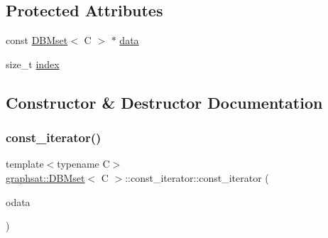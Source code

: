 \subsection*{Protected Attributes}
\begin{DoxyCompactItemize}
\item 
const \mbox{\hyperlink{classgraphsat_1_1_d_b_mset}{D\+B\+Mset}}$<$ C $>$ $\ast$ \mbox{\hyperlink{classgraphsat_1_1_d_b_mset_1_1const__iterator_a60449a8735b6e159ba72f0f76e851cbe}{data}}
\item 
size\+\_\+t \mbox{\hyperlink{classgraphsat_1_1_d_b_mset_1_1const__iterator_a49e5420ca3eb37b0e27bb0be57338051}{index}}
\end{DoxyCompactItemize}


\subsection{Constructor \& Destructor Documentation}
\mbox{\label{classgraphsat_1_1_d_b_mset_1_1const__iterator_acc4063dc1e5ba8bbeddfc5814dc3a417}} 
\subsubsection{\texorpdfstring{const\_iterator()}{const\_iterator()}\hspace{0.1cm}{\footnotesize\ttfamily [1/3]}}
{\footnotesize\ttfamily template$<$typename C$>$ \\
\mbox{\hyperlink{classgraphsat_1_1_d_b_mset}{graphsat\+::\+D\+B\+Mset}}$<$ C $>$\+::const\+\_\+iterator\+::const\+\_\+iterator (\begin{DoxyParamCaption}\item[{const \mbox{\hyperlink{classgraphsat_1_1_d_b_mset}{D\+B\+Mset}}$<$ C $>$ $\ast$}]{odata }\end{DoxyParamCaption})\hspace{0.3cm}{\ttfamily [inline]}}

\mbox{\label{classgraphsat_1_1_d_b_mset_1_1const__iterator_a5b9226c674cdc018deeb7665b0415442}} 
